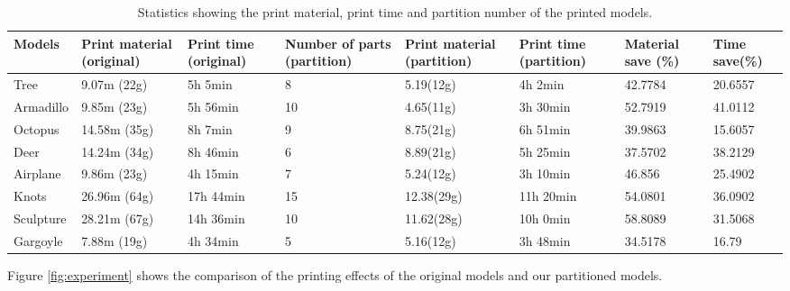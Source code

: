 \begin{table}[htb]

\begin{footnotesize}

\begin{center}

    \begin{tabular}{ p{1cm} p{1.5cm} p{1.5cm} p{1.81cm} p{1.53cm} p{1.5cm} p{1.7cm} p{1.7cm} }

    \hline

     Models& Print material (original)& Print time (original)& Number of parts (partition)& Print material (partition)& Print time (partition)& Material save (\%) &Time save(\%)\\ \hline
     Tree& 9.07m (22g)& 5h 5min & 8 &5.19(12g) & 4h 2min & 42.7784 &20.6557\\ \hline
     Armadillo& 9.85m (23g)& 5h 56min & 10  &4.65(11g) & 3h 30min & 52.7919 &41.0112\\ \hline
     Octopus& 14.58m (35g)& 8h 7min & 9  &8.75(21g) &6h 51min & 39.9863 &15.6057\\ \hline
     Deer& 14.24m (34g)& 8h 46min & 6  &8.89(21g) &5h 25min & 37.5702 &38.2129\\ \hline
     Airplane& 9.86m (23g)& 4h 15min & 7 &5.24(12g) &3h 10min & 46.856 &25.4902\\ \hline
     Knots& 26.96m (64g)& 17h 44min & 15 &12.38(29g) &11h 20min & 54.0801 &36.0902\\ \hline
     Sculpture& 28.21m (67g)& 14h 36min & 10 &11.62(28g) &10h 0min & 58.8089 &31.5068\\ \hline
     Gargoyle& 7.88m (19g)& 4h 34min & 5 &5.16(12g) &3h 48min & 34.5178 &16.79\\ \hline

  \hline

    \end{tabular}

\end{center}

\end{footnotesize}

\caption{Statistics showing the print material, print time and partition number of the printed models.}\label{tab:ertms:summary}

\end{table}



Figure \ref{fig:experiment} shows the comparison of the printing effects of the original models and our partitioned models.

